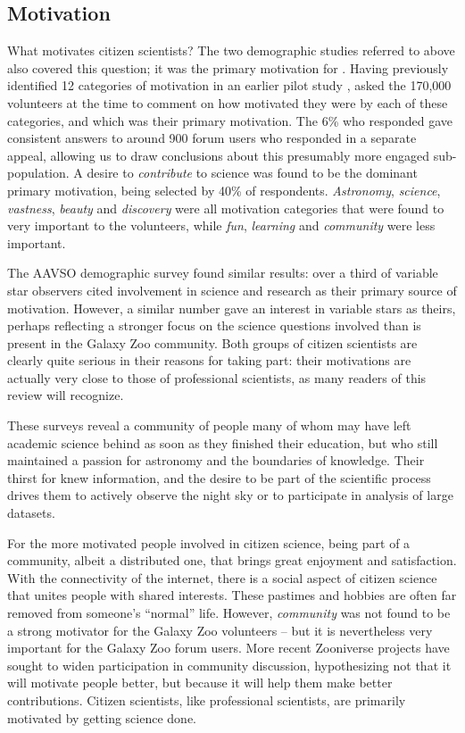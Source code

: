 \documentclass{ar2e}
\begin{document}

\subsection{Motivation}
\label{sec:crowd:motivation}

What motivates citizen scientists? The two demographic studies referred to
above also covered this question; it was the primary motivation for
\citeauthor{Rad++2013}. Having previously identified 12 categories of
motivation in an earlier pilot study \citep{Rad++2010}, \citeauthor{Rad++2013}
asked the 170,000 volunteers at the time to comment on how motivated they were
by each of these categories, and which was their primary motivation. The 6\%
who responded gave consistent answers to around 900 forum users who responded
in a separate appeal, allowing us to draw conclusions about this presumably
more engaged sub-population. A desire to {\it contribute} to science was found
to be the dominant primary motivation, being selected by 40\% of respondents.
{\it Astronomy}, {\it science}, {\it vastness}, {\it beauty} and 
{\it discovery} were all motivation categories that were found to very
important to the volunteers, while {\it fun}, {\it learning} and {\it
community} were less important. 

The AAVSO demographic survey \citep{P+P2012} found similar results: over a
third of variable star observers cited involvement in science and research as
their primary source of motivation. However, a similar number gave an interest
in variable stars as theirs, perhaps reflecting a stronger focus on the
science questions involved than is present in the Galaxy Zoo community. Both
groups of citizen scientists are clearly quite serious in their reasons for
taking part: their motivations are actually very close to those of
professional scientists, as many readers of this review will recognize.

These surveys reveal a community of people many of whom may have left  
academic science behind as soon as they finished their  education, but who
still maintained a passion for astronomy and the  boundaries of knowledge. 
Their thirst for knew information, and the  desire to be part of the 
scientific process drives them to actively observe the  night sky or to
participate in analysis of large datasets.  

For the more motivated people involved in citizen science, being part of a
community, 
albeit a distributed one, that brings great enjoyment and satisfaction.  With
the connectivity of the internet, there is a social  aspect of citizen science
that unites people with shared interests.   These pastimes and hobbies are
often far removed from someone's ``normal''  life. However, {\it community}
was not found to be a strong motivator for the Galaxy Zoo volunteers -- but it
is nevertheless very important for the Galaxy Zoo forum users. More recent
Zooniverse projects have sought to widen participation in community
discussion, hypothesizing not that it will motivate people better, but because
it will help them make better contributions. Citizen scientists, like
professional scientists, are primarily motivated by getting science done.
\end{document}
